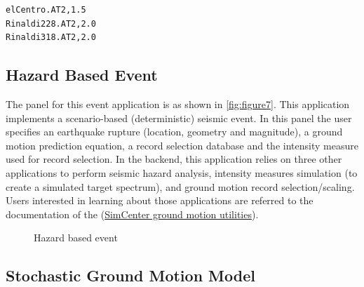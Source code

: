 \begin{verbatim}
elCentro.AT2,1.5
Rinaldi228.AT2,2.0
Rinaldi318.AT2,2.0
\end{verbatim}


\subsection{Hazard Based Event}
The panel for this event application is as shown
in \autoref{fig:figure7}.  This application implements a
scenario-based (deterministic) seismic event.  In this panel the user
specifies an earthquake rupture (location, geometry and magnitude), a
ground motion prediction equation, a record selection database and the
intensity measure used for record selection.  In the backend, this
application relies on three other applications to perform seismic
hazard analysis, intensity measures simulation (to create a simulated
target spectrum), and ground motion record selection/scaling.  Users
interested in learning about those applications are referred to the
documentation of the
(\href{https://github.com/NHERI-SimCenter/GroundMotionUtilities/blob/master/Readme.md}{SimCenter
ground motion utilities}).
\begin{figure}[!htbp]
  \caption{Hazard based event}
  \label{fig:figure7}
\end{figure}

\subsection{Stochastic Ground Motion Model}



